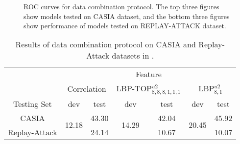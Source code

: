 \documentclass[letterpaper, 10 pt, conference]{ieeeconf}
\begin{document}
\begin{figure*}
\begin{minipage}[b]{0.3\linewidth}
\centering
\centerline{}
\end{minipage}
\hfill
\begin{minipage}[b]{0.3\linewidth}
\centering
\centerline{}
\end{minipage}
\hfill
\begin{minipage}[b]{0.3\linewidth}
\centering
\centerline{}
\end{minipage}
\\
\\
\begin{minipage}[b]{0.3\linewidth}
\centering
\centerline{}
\end{minipage}
\hfill
\begin{minipage}[b]{0.3\linewidth}
\centering
\centerline{}
\end{minipage}
\hfill
\begin{minipage}[b]{0.3\linewidth}
\centering
\centerline{}
\end{minipage}
\caption{ROC curves for data combination protocol. The top three figures show models tested on CASIA dataset, and the bottom three figures show performance of models tested on REPLAY-ATTACK dataset.}
\label{Fig_9}
\end{figure*}

\begin{table}[!htb]
\caption{Results of data combination protocol on CASIA and Replay-Attack datasets in \cite{Face_Anti_Spoofing_Pereira_2013}.}
\label{TB_COMBINED_PREVIOUS}
\centering
\begin{tabular}{|c|c|c|c|c|c|c|}
\cline{2-7}
\multicolumn{1}{c|}{}      & \multicolumn{6}{c|}{Feature}     \\
       \cline{2-7}
 \multicolumn{1}{c|}{}     & \multicolumn{2}{c|}{Correlation} & \multicolumn{2}{c|}{LBP-TOP$^{u2}_{8,8,8,1,1,1}$} & \multicolumn{2}{c|}{LBP$^{u2}_{8, 1}$} \\
       \hline
Testing Set      & dev & test & dev & test & dev & test \\ 
       \hline
CASIA   & \multirow{2}{*}{12.18} & 43.30 & \multirow{2}{*}{14.29} & 42.04 & \multirow{2}{*}{20.45} & 45.92 \\
Replay-Attack  & & 24.14 & & 10.67 & & 10.07 \\
\hline
\end{tabular}
\end{table}
\end{document}
